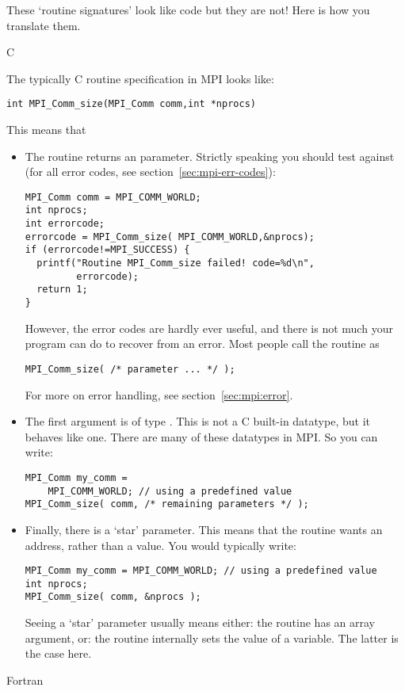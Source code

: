 These `routine signatures' look like code but they are not! Here is
how you translate them.

 {C}

The typically C routine specification in MPI looks like:
\begin{lstlisting}
int MPI_Comm_size(MPI_Comm comm,int *nprocs)
\end{lstlisting}
This means that
\begin{itemize}
\item The routine returns an  parameter. Strictly speaking you
  should test against  (for all error codes,
  see section~\ref{sec:mpi-err-codes}):
\begin{lstlisting}
MPI_Comm comm = MPI_COMM_WORLD;
int nprocs;
int errorcode;
errorcode = MPI_Comm_size( MPI_COMM_WORLD,&nprocs);
if (errorcode!=MPI_SUCCESS) {
  printf("Routine MPI_Comm_size failed! code=%d\n",
         errorcode);
  return 1;
}
\end{lstlisting}
  However, the error codes are hardly ever useful, and there is not
  much your program can do to recover from an error. Most people call
  the routine as
\begin{lstlisting}
MPI_Comm_size( /* parameter ... */ );
\end{lstlisting}
For more on error handling, see section~\ref{sec:mpi:error}.
\item The first argument is of type . This is not a C
  built-in datatype, but it behaves like one. There are many of these
   datatypes in MPI. So you can write:
\begin{lstlisting}
MPI_Comm my_comm =
    MPI_COMM_WORLD; // using a predefined value
MPI_Comm_size( comm, /* remaining parameters */ );
\end{lstlisting}
\item Finally, there is a `star' parameter. This means that the
  routine wants an address, rather than a value. You would typically write:
\begin{lstlisting}
MPI_Comm my_comm = MPI_COMM_WORLD; // using a predefined value
int nprocs;
MPI_Comm_size( comm, &nprocs );
\end{lstlisting}
  Seeing a `star' parameter usually means either: the routine has an
  array argument, or: the routine internally sets the value of a
  variable. The latter is the case here.
\end{itemize}

 {Fortran}

